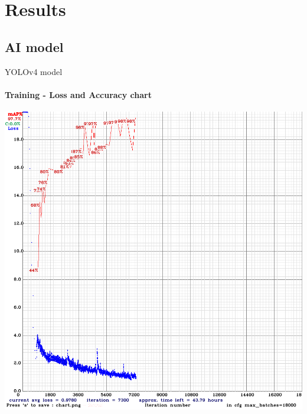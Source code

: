\documentclass{beamer}
\begin{document}
	\section{Results}
	\subsection{AI model}
	\begin{frame}{YOLOv4 model}
		\framesubtitle{Training - Loss and Accuracy chart}
		\begin{center}
			\includegraphics[height=0.7\textheight]{res/darknet_training_chart}
		\end{center}
	\end{frame}
\end{document}
